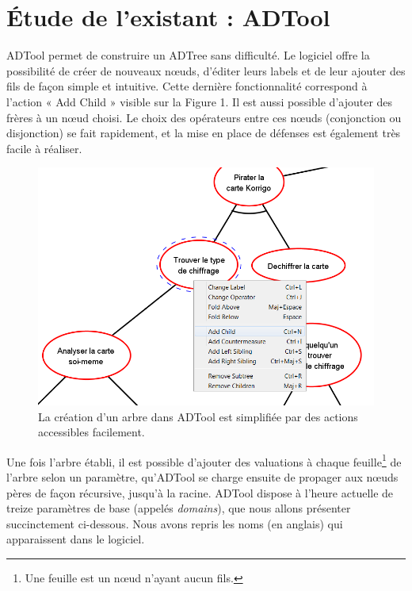 \section{Étude de l'existant : ADTool}
	\label{sec:adtool}


	ADTool permet de construire un ADTree sans difficulté. Le logiciel offre la possibilité de créer de nouveaux nœuds, d'éditer leurs labels et de leur ajouter des fils de façon simple et intuitive. Cette dernière fonctionnalité correspond à l'action « Add Child » visible sur la Figure 1. Il est aussi possible d'ajouter des frères à un nœud choisi. Le choix des opérateurs entre ces nœuds (conjonction ou disjonction)  se fait rapidement, et la mise en place de défenses est également très facile à réaliser. 
	
	\begin{figure}[h]
        \centering
        \includegraphics[width=1\textwidth]{figure/adtool_add_child.png}
        \caption{La création d'un arbre dans ADTool est simplifiée par des actions accessibles facilement.}
        \label{fig:arbre_exemple_1}
    \end{figure}
	
	Une fois l'arbre établi, il est possible d'ajouter des valuations à chaque feuille\footnote{Une feuille est un nœud n'ayant aucun fils.} de l'arbre selon un paramètre, qu'ADTool se charge ensuite de propager aux nœuds pères de façon récursive, jusqu'à la racine. ADTool dispose à l'heure actuelle de treize paramètres de base (appelés \textit{domains}), que nous allons présenter succinctement ci-dessous. Nous avons repris les noms (en anglais) qui apparaissent dans le logiciel. 
					
